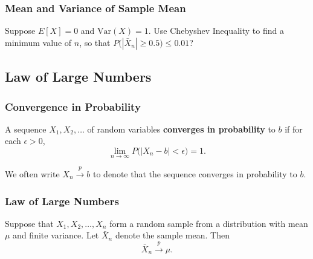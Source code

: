 \documentclass{beamer}
\begin{document}
\begin{frame}[t]
\frametitle{Mean and Variance of Sample Mean}
\begin{Example}
Suppose $E[X] = 0$ and $\text{Var}(X) = 1$. Use Chebyshev Inequality to find a minimum value of $n$, so that $P\Big(|\bar{X}_n| \geq 0.5\Big) \leq 0.01$?
\end{Example}

\end{frame}


\subsection{Law of Large Numbers}

\begin{frame}
\frametitle{Convergence in Probability}
\begin{Definition}
A sequence $X_1, X_2,\ldots$ of random variables {\bf converges in probability} to $b$ if for each $\epsilon > 0$,
$$
\lim_{n\to\infty} P\Big(|X_n - b| < \epsilon\Big) = 1.
$$
\end{Definition}
We often write $X_n\stackrel{p}{\longrightarrow} b$ to denote that the sequence converges in probability to $b$.
\end{frame}

\begin{frame}
\frametitle{Law of Large Numbers}

\begin{Theorem}
Suppose that $X_1, X_2,\ldots, X_n$ form a random sample from a distribution with mean $\mu$ and finite variance. Let $\bar{X}_n$ denote the sample mean. Then
$$
\bar{X}_n\stackrel{p}{\longrightarrow} \mu.
$$
\end{Theorem}

\end{frame}
\end{document}
